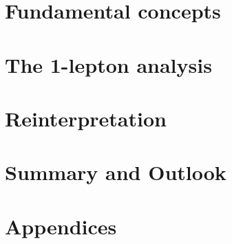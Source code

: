\documentclass[a4paper,11pt,numbered,customfont,print]{Classes/PhDThesisPSnPDF}
\begin{document}


\part{Fundamental concepts}\label{part:fundamentals}

\cleardoublepage

\cleardoublepage

\cleardoublepage

\part{The 1-lepton analysis}\label{part:simplified_model_analysis}

\cleardoublepage

\cleardoublepage

\cleardoublepage

\cleardoublepage

\cleardoublepage

\part{Reinterpretation}\label{part:reinterpretation}

\cleardoublepage

\cleardoublepage

\cleardoublepage

\part{Summary and Outlook}\label{part:summary}





\part{Appendices}
\begin{appendices} %
	
	
	
	
	
\end{appendices}
\end{document}
